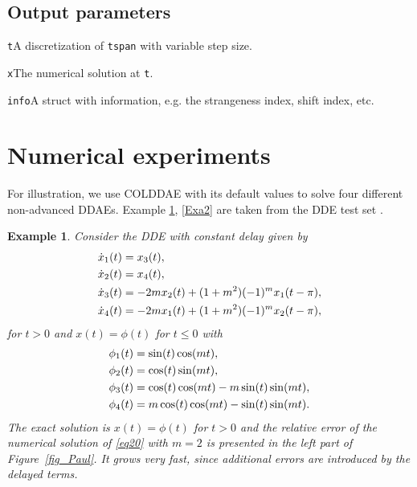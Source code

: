 \documentclass[final,reqno]{siamltex}
\renewenvironment{itemize}[1]{\begin{compactitem}#1}{\end{compactitem}}
\newtheorem{example}[theorem]{Example}
\begin{document}
\subsection{Output parameters}
\begin{itemize}
\item {\tt t}\quad A discretization of {\tt tspan} with variable step size.
\item {\tt x}\quad The numerical solution at {\tt t}.
\item {\tt info}\quad A struct with information, e.g. the strangeness index, shift index, etc.
\end{itemize}

\section{Numerical experiments}
For illustration, we use COLDDAE with its default values to solve four different non-advanced DDAEs.
Example \ref{Exa1}, \ref{Exa2} are taken from the DDE test set \cite{Pau94}.
%
\begin{example}\label{Exa1} {\rm Consider the DDE with constant delay given by
%
\bsq\label{eq20}
\begin{equation}\label{eq20a}
\bsp{
\dot{x}_1(t) & = x_3(t),\\
\dot{x}_2(t) & = x_4(t),\\
\dot{x}_3(t) & = -2mx_2(t)+(1+m^2)(-1)^mx_1(t-\pi),\\
\dot{x}_4(t) & = -2mx_1(t)+(1+m^2)(-1)^mx_2(t-\pi),
}
\end{equation}
for $t>0$ and $x(t)=\phi(t)$ for $t\leq 0$ with
\begin{equation}\label{eq20b}
\bsp{
{\phi}_1(t) & = \sin(t)\cos(mt),\\
{\phi}_2(t) & = \cos(t)\sin(mt),\\
{\phi}_3(t) & = \cos(t)\cos(mt)-m\sin(t)\sin(mt),\\
{\phi}_4(t) & =m\cos(t)\cos(mt)-\sin(t)\sin(mt).
}
\end{equation}
\esq
%
The exact  solution is $x(t)=\phi(t)$ for $t>0$ and the relative error of the numerical solution of \eqref{eq20} with $m=2$ is presented in the left part of Figure~\ref{fig_Paul}. It grows very  fast, since additional errors are introduced by the delayed terms.
}
\end{example}
%
\end{document}
